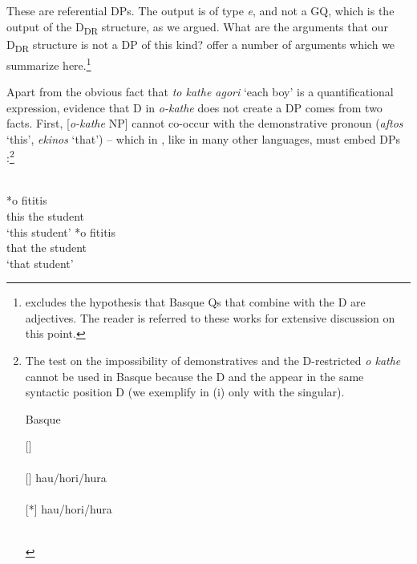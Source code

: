 \documentclass[output=paper,
modfonts
]{langscibook}
\begin{document}
These are referential DPs. The output is of type \textit{e}, and not a GQ, which is the output of the D\textsubscript{DR} structure, as we argued. What are the arguments that our D\textsubscript{DR} structure is not a DP of this kind? \citet{etxeberria-giannakidou2014} offer a number of arguments which we summarize here.\footnote{\citet{etxeberria2005, etxeberria2009} excludes the hypothesis that Basque Qs that combine with the D are adjectives. The reader is referred to these works for extensive discussion on this point.}

Apart from the obvious fact that \textit{to kathe agori} `each boy' is a quantificational expression, evidence that D in \textit{o-kathe} does not create a DP comes from two facts. First, [\textit{o-kathe} NP] cannot co-occur with the demonstrative pronoun (\textit{aftos} `this', \textit{ekinos} `that') -- which in , like in many other languages, must embed DPs \citep{stavrou1983, stavrou-horrocks1989, AlexiadouEtAlii2008}:\footnote{The  test on the impossibility of demonstratives and the D-restricted \textit{o kathe}  cannot be used in Basque because the D and the  appear in the same syntactic position D (we exemplify in (i) only with the singular).

\begin{exe}
\label{ex:etxeberria:i} \textnormal{Basque}
	\begin{xlist}
	[]{ \footnotesize
		\\
		\\
		\glt {}}
	[]{ \footnotesize
		 {hau/hori/hura}\\
		 \\
		\glt {}}
	{ \footnotesize 
		 {hau/hori/hura}\\
		 \\
		\glt {}}
	\end{xlist}
\end{exe}} \newpage 

\ea\label{ex:etxeberria:25} \\
\ea
{} \textnormal{*}{\op}{o}{\cp} {fititis}\\
this \phantom{*(}the student\\
\glt `this student'
\ex
{} \textnormal{*}{\op}{o}{\cp} {fititis}\\
that \phantom{*(}the student\\
\glt `that student'
\z
\z
\end{document}
